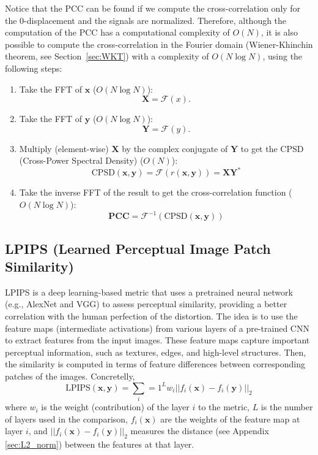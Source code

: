 \documentclass{article}
\begin{document}
Notice that the PCC can be found if we compute the cross-correlation
only for the 0-displacement and the signals are normalized. Therefore,
although the computation of the PCC has a computational complexity of
$O(N)$, it is also possible to compute the cross-correlation in the
Fourier domain (Wiener-Khinchin theorem, see Section~\ref{sec:WKT})
with a complexity of $O(N\log N)$, using the following steps:
\begin{enumerate}
\item Take the FFT of $\mathbf{x}$ ($O(N\log N)$):
  \begin{equation}
    \mathbf{X} = \mathcal{F}(x).
  \end{equation}
\item Take the FFT of $\mathbf{y}$ ($O(N\log N)$):
  \begin{equation}
    \mathbf{Y} = \mathcal{F}(y).
  \end{equation}
\item Multiply (element-wise) $\mathbf{X}$ by the complex conjugate of
  $\mathbf{Y}$ to get the CPSD (Cross-Power Spectral Density) ($O(N)$):
  \begin{equation}
    \text{CPSD}(\mathbf{x},\mathbf{y})=\mathcal{F}({r(\mathbf{x},\mathbf{y})})=\mathbf{X}\mathbf{Y}^*
  \end{equation}
\item Take the inverse FFT of the result to get the cross-correlation
  function ($O(N\log N)$):
  \begin{equation}
    \mathbf{PCC} = \mathcal{F}^{-1}(\text{CPSD}(\mathbf{x},\mathbf{y}))
  \end{equation}
\end{enumerate}


\subsection{LPIPS (Learned Perceptual Image Patch Similarity)}

LPIPS \cite{zhang2018unreasonable} is a deep learning-based metric that
uses a pretrained neural network (e.g., AlexNet and VGG) to assess
perceptual similarity, providing a better correlation with the human
perfection of the distortion. The idea is to use the feature maps
(intermediate activations) from various layers of a pre-trained CNN to
extract features from the input images. These feature maps capture
important perceptual information, such as textures, edges, and
high-level structures. Then, the similarity is computed in terms of
feature differences between corresponding patches of the
images. Concretelly,
\begin{equation}
  \text{LPIPS}(\mathbf{x}, \mathbf{y}) = \sum_i=1^Lw_i||f_i(\mathbf{x}) - f_i(\mathbf{y})||_2
\end{equation}
where $w_i$ is the weight (contribution) of the layer $i$ to the
metric, $L$ is the number of layers used in the comparison,
$f_i(\mathbf{x})$ are the weights of the feature map at layer $i$, and
$||f_i(\mathbf{x}) - f_i(\mathbf{y})||_2$ measures the distance (see
Appendix \ref{sec:L2_norm}) between the features at that layer.
\end{document}
